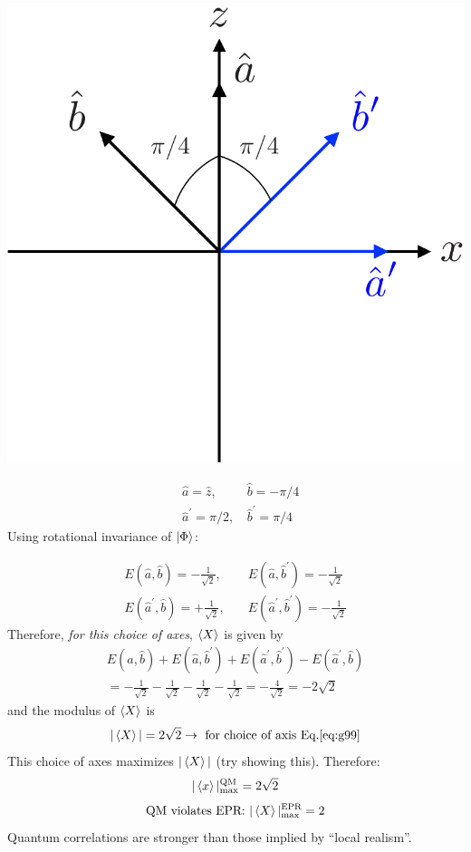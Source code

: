 \documentclass[12pt]{article}
\newcommand{\be}{\begin{equation}}
\newcommand{\ee}{\end{equation}}
\begin{document}
\begin{minipage}{0.45\textwidth}
\includegraphics[width=\textwidth]{Figures/Bell-axes-crop.pdf}
\end{minipage}%
\hfill%
\begin{minipage}{0.45\textwidth}
\be
\begin{aligned}
&\hat{a}=\hat{z},\,         &\hat{b}=-\pi / 4 \\ 
&\hat{a}^{\prime}=\pi / 2,\,&\hat{b}^{\prime}=\pi / 4
\end{aligned}
\label{eq:g99}
\ee
Using rotational invariance of $\ket{\Phi}$:
\end{minipage}

\be
\begin{aligned}
E(\hat{a}, \hat{b})=-\frac{1}{\sqrt{2}},\quad 
& E\left(\hat{a}, \hat{b}^{\prime}\right)=-\frac{1}{\sqrt{2}} \\ 
E(\hat{a}^{\prime}, \hat{b})=+\frac{1}{\sqrt{2}},\quad 
& E\left(\hat{a}^{\prime}, \hat{b}^{\prime}\right)=-\frac{1}{\sqrt{2}}
\end{aligned}
\ee
Therefore, \emph{for this choice of axes}, $\ev{X}$ is given by
\be
\begin{gathered}
E(\hat{a}, \hat{b}) + E(\hat{a}, \hat{b}^{\prime}) +
E(\hat{a}^{\prime}, \hat{b}^{\prime}) -
E(\hat{a}^{\prime}, \hat{b})\\
= -\frac{1}{\sqrt{2}} -\frac{1}{\sqrt{2}} -\frac{1}{\sqrt{2}} -\frac{1}{\sqrt{2}} 
= -\frac{4}{\sqrt{2}} = -2\sqrt{2}
\end{gathered}
\ee
and the modulus of $\ev{X}$ is
\be
|\ev{X}| = 2\sqrt{2}\to\text{ for choice of axis Eq.\eqref{eq:g99}}
\ee
This choice of axes maximizes $|\ev{X}|$ (try showing this). Therefore:
\be
|\ev{x}|^{\text{QM}}_{\max} = 2\sqrt{2}
\ee
\be
\text{QM violates EPR: } |\ev{X}|^{\text{EPR}}_{\max} = 2
\ee
Quantum correlations are stronger than
those implied by ``local realism''.
\end{document}

